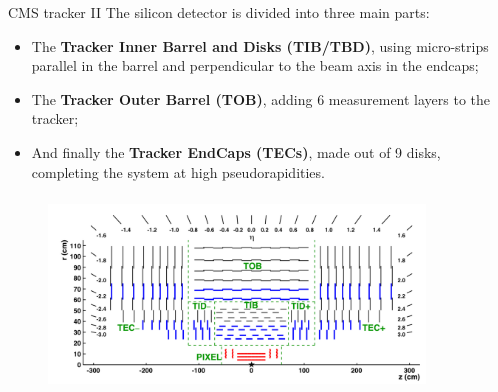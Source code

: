 \documentclass[8pt]{beamer}
\begin{document}
\begin{frame}{CMS tracker II}
\justifying
\vspace{5pt}
The \alert{silicon detector} is divided into three main parts:
\begin{itemize}
\item The \textbf{Tracker Inner Barrel and Disks (TIB/TBD)}, using micro-strips parallel in the barrel and perpendicular to the beam axis in the endcaps;
\item The \textbf{Tracker Outer Barrel (TOB)}, adding 6 measurement layers to the tracker;
\item And finally the \textbf{Tracker EndCaps (TECs)}, made out of 9 disks, completing the system at high pseudorapidities.
\end{itemize} \vfill

\begin{figure}[htbp]
\begin{center}
\includegraphics[width=10cm, height=5.2cm]{figs/CMSTracker.png}
\end{center}
\end{figure}\vfill
\end{frame}
\end{document}
